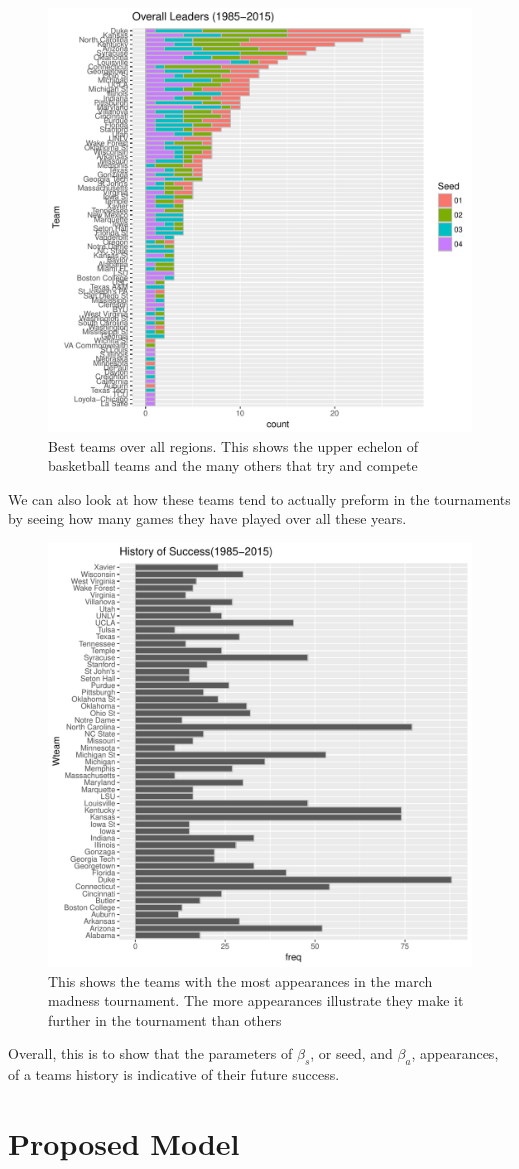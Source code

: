 \documentclass[]{scrartcl}
\begin{document}
\begin{figure}[H]
	\centering
	\includegraphics[]{455Project/overLeaders.pdf}
	\caption[overallLeaders]{Best teams over all regions. This shows the upper echelon of basketball teams and the many others that try and compete}
	\label{rVals}
\end{figure}
We can also look at how these teams tend to actually preform in the tournaments by seeing how many games they have played over all these years.
\begin{figure}[H]
	\centering
	\includegraphics[]{455Project/HistOfSuccess2.pdf}
	\caption[HistOfSuccess]{This shows the teams with the most appearances in the march madness tournament. The more appearances illustrate they make it further in the tournament than others}
	\label{rVals}
\end{figure}

Overall, this is to show that the parameters of $\beta_s$, or seed, and $\beta_a$, appearances, of a teams history is indicative of their future success.
\section*{Proposed Model}
\end{document}

